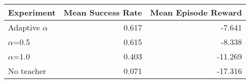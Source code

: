 \begin{tabular}{lrr}
\toprule
Experiment & Mean Success Rate & Mean Episode Reward \\
\midrule
Adaptive $\alpha$ &             0.617 &              -7.641 \\
$\alpha$=0.5      &             0.615 &              -8.338 \\
$\alpha$=1.0      &             0.403 &             -11.269 \\
No teacher     &             0.071 &             -17.316 \\
\bottomrule
\end{tabular}

